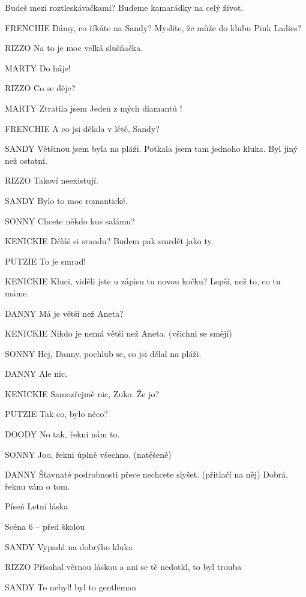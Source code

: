                Budeš mezi roztleskávačkami? Budeme kamarádky na celý život.

FRENCHIE        Dámy, co říkáte na Sandy? Myslíte, že může do klubu Pink Ladies?

RIZZO        Na to je moc velká slušňačka.

MARTY        Do háje!

RIZZO        Co se děje?

MARTY         Ztratila jsem Jeden z mých diamantů !

FRENCHIE         A co jsi dělala v létě, Sandy?

SANDY        Většinou jsem byla na pláži. Potkala jsem tam jednoho kluka. Byl jiný         než ostatní.

RIZZO        Takoví neexistují.

SANDY        Bylo to moc romantické.





SONNY        Chcete někdo kus salámu?

KENICKIE         Děláš si srandu? Budem pak smrdět jako ty.

PUTZIE         To je smrad!

KENICKIE        Kluci, viděli jste u zápisu tu novou kočku? Lepší, než to, co tu máme.

DANNY        Má je větší než Aneta?

KENICKIE        Nikdo je nemá větší než Aneta. (všichni se smějí)

SONNY        Hej, Danny,  pochlub se, co jsi dělal na pláži. 

DANNY        Ale nic. 

KENICKIE        Samozřejmě nic, Zuko. Že jo?

PUTZIE         Tak co, bylo něco?

DOODY        No tak, řekni nám to.

SONNY         Joo, řekni úplně všechno. (natěšeně)

DANNY        Šťavnaté podrobnosti přece nechcete slyšet. (přitlačí na něj) Dobrá,                 řeknu vám o tom.

Píseň Letní láska 

Scéna 6 – před školou 

SANDY                 Vypadá na dobrýho kluka

RIZZO        Přísahal věrnou láskou a ani se tě nedotkl, to byl trouba

SANDY        To nebyl! byl to gentleman


